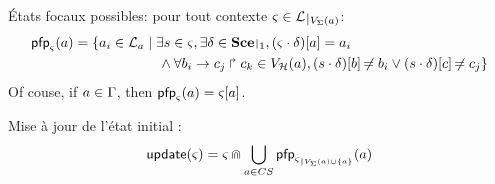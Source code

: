 \begin{comment}
==========================

Bonds possibles :
\begin{align*}
\bounceprocs_\ctx = \{ a_i \in \PHproc \mid \exists s \in \ctx, \exists \delta \in \restriction{\Sce}{k-1}, a_i \in (s \PHplay \delta) \}
\end{align*}
\end{comment}

États focaux possibles: pour tout contexte $\ctx \in \restriction{\PHl}{\Vs(a)}$:
\begin{align*}
  \pfp_\ctx(a) = \{ a_i \in \PHl_a &\mid \exists s \in \ctx, \exists \delta \in \restriction{\Sce}{1}, \PHget{(\ctx \PHplay \delta)}{a} = a_i \\
  & \quad \wedge \forall \PHhit{b_i}{c_j}{c_k} \in \Vh(a), \PHget{(s \PHplay \delta)}{b} \neq b_i \vee \PHget{(s \PHplay \delta)}{c} \neq c_j \}
\end{align*}
Of couse, if $a \in \Gamma$, then $\mathsf{pfp}_\varsigma(a) = {\varsigma[a]}$.

Mise à jour de l'état initial :
\begin{align*}
  \update(\ctx) = \ctx \Cap \bigcup_{a \in CS} \pfp_{\restriction{\ctx}{\Vs(a) \cup \{ a \}}}(a)
\end{align*}


\begin{comment}
Séquences de bonds abstraites :
$$\BS^\wedge(P) = \{ \zeta^\wedge \mid \zeta \in \BS(P), \nexists \zeta' \in \BS(P), \zeta'^\wedge \subsetneq \zeta^\wedge \}$$
where $\zeta^\wedge = (\zeta^\wedge_A, \zeta^\wedge_B, \zeta^\wedge_{max})$ with:
\begin{itemize}
  \item $\zeta^\wedge_A = \{ \PHhitter(\zeta_n) \mid n \in \indexes{\zeta} \wedge \PHsort(\PHhitter(\zeta_n)) \neq \PHsort(P) \}$ : ens. des requis d'autres sortes (frappeurs)
  \item $\zeta^\wedge_B = \{ \PHhitter(\zeta_n) \mid n \in \indexes{\zeta} \} \cup \{ \PHtarget(\zeta_n) \mid n \in \indexes{\zeta} \}$ : ens. des processus nécessaires (à ne pas perturber)
  \item $\zeta^\wedge_{max} = \max_{n \in \indexes{\zeta}}(\prio(\zeta_n))$ : plus faible priorité
\end{itemize}
\end{comment}

